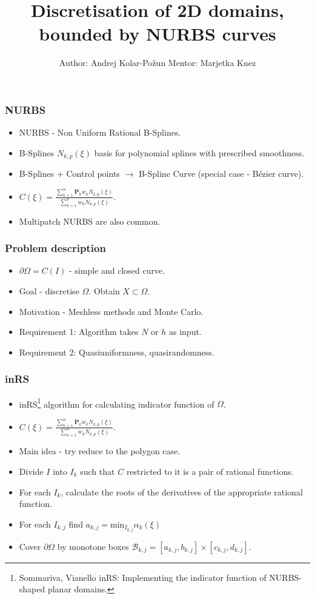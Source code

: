 \documentclass{beamer}
\title[Discretisation of 2D domains, bounded by NURBS]{Discretisation of 2D domains, bounded by NURBS curves}
\author[Andrej Kolar - Po{\v z}un]{Author: Andrej Kolar-Po{\v z}un \linebreak Mentor: Marjetka Knez}
\begin{document}
\begin{frame}
\titlepage
\end{frame}
\begin{frame}
\frametitle{NURBS}
\begin{itemize}
\item<1-> NURBS - Non Uniform Rational B-Splines.
\item<2-> B-Splines $N_{k,p}(\xi)$ basis for polynomial splines with prescribed smoothness.
\item<3-> B-Splines + Control points $\to$ B-Spline Curve (special case - Bézier curve).
\item<4-> $C(\xi) = \frac{\sum_{k=1}^n \textbf{P}_k w_k N_{k,p} (\xi)}{\sum_{k=1}^n w_k N_{k,p}(\xi)}$. 
\item<5-> Multipatch NURBS are also common.
\end{itemize}

\end{frame}
\begin{frame}
\frametitle{Problem description}
\begin{itemize}
\item<1-> $\partial \Omega = C(I)$ - simple and closed curve.
\item<2-> Goal - discretise $\Omega$. Obtain $X \subset \Omega$.
\item<3-> Motivation - Meshless methods and Monte Carlo.
\item<4-> Requirement 1: Algorithm takes $N$ or $h$ as input. 
\item<5-> Requirement 2: Quasiuniformness, quasirandomness.
\end{itemize}
\end{frame}
\begin{frame}
\frametitle{inRS}
\begin{itemize}
\item<1-> inRS\footnote{Sommariva, Vianello inRS: Implementing the indicator function of NURBS-shaped planar domains.} algorithm for calculating indicator function of $\Omega$.
\item<2-> $C(\xi) = \frac{\sum_{k=1}^n \textbf{P}_k w_k N_{k,p} (\xi)}{\sum_{k=1}^n w_k N_{k,p}(\xi)}$. 
\item<3-> Main idea - try reduce to the polygon case.
\item<4-> Divide $I$ into $I_k$ such that $C$ restricted to it is a pair of rational functions.
\item<5-> For each $I_k$, calculate the roots of the derivatives of the appropriate rational function.
\item<6-> For each $I_{k,j}$ find $a_{k,j} = \mathrm{min}_{I_{k,j}} \alpha_k(\xi)$
\item<7-> Cover $\partial \Omega$ by monotone boxes $\mathcal{B}_{k,j} = [a_{k,j},b_{k,j}] \times [c_{k,j} , d_{k,j}]$.
\end{itemize}
\end{frame}
\end{document}
